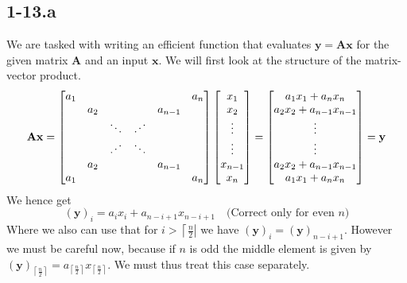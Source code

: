 \documentclass{article}
\begin{document}
\subsection*{1-13.a} 
We are tasked with writing an efficient function that evaluates $\mathbf{y} = \mathbf{A}\mathbf{x}$ for the given matrix $\mathbf{A}$ and an input $\mathbf{x}$. We will first look at the structure of the matrix-vector product.
\begin{equation*}
\mathbf{A}\mathbf{x} = 
    \begin{bmatrix}
    a_{1} & &&& & a_{n} \\
     & a_{2} &&&  a_{n-1} &\\
     & &\ddots  &\text{\reflectbox{$\ddots$}}& & \\
     &&\text{\reflectbox{$\ddots$}} & \ddots& &  \\
     & a_{2} &&&  a_{n-1} &\\
     a_{1} &&&&& a_{n}
    \end{bmatrix} 
    \begin{bmatrix}
        x_{1} \\
        x_{2} \\
        \vdots \\
        \vdots \\
        x_{n-1} \\
        x_{n}
    \end{bmatrix} = 
    \begin{bmatrix}
        a_{1}x_{1} + a_{n}x_{n} \\
        a_{2}x_{2} + a_{n-1}x_{n-1} \\
        \vdots \\
        \vdots \\
        a_{2}x_{2} + a_{n-1}x_{n-1} \\
        a_{1}x_{1} + a_{n}x_{n}
    \end{bmatrix} = \mathbf{y}
\end{equation*}
We hence get
\begin{equation*}
    \left(\mathbf{y}\right)_{i} = a_{i}x_{i} + a_{n - i + 1}x_{n - i + 1} \quad \text{(Correct only for even $n$)}
\end{equation*}
Where we also can use that for $i > \left\lceil \frac{n}{2}\right\rvert$ we have $\left(\mathbf{y}\right)_{i} = \left(\mathbf{y}\right)_{n- i + 1}$. However we must be careful now, because if $n$ is odd the middle element is given by $\left(\mathbf{y}\right)_{\left\lceil \frac{n}{2}\right\rceil} = a_{\left\lceil \frac{n}{2}\right\rceil}x_{\left\lceil \frac{n}{2}\right\rceil}$. We must thus treat this case separately. 
\end{document}
